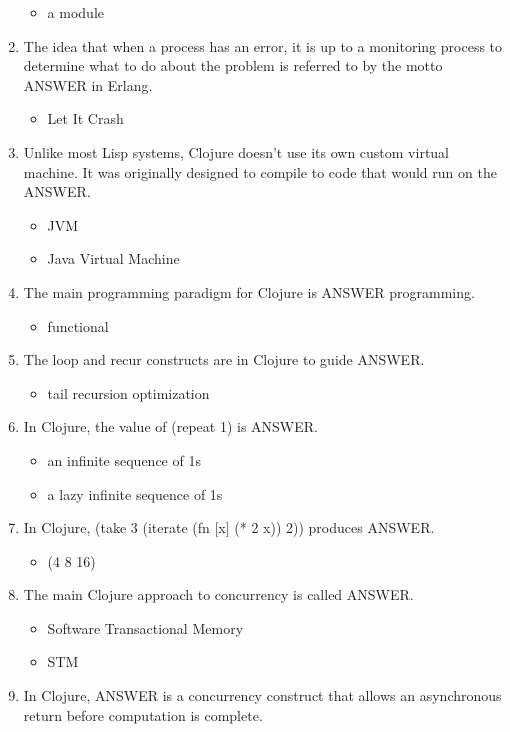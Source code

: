 \documentclass{exam}
\begin{document}
\begin{enumerate}
\begin{itemize}
\item a module
\end{itemize}
\item The idea that when a process has an error, it is up to a monitoring process to determine what to do about the problem is referred to by the motto ANSWER in Erlang.
\begin{itemize}
\item Let It Crash
\end{itemize}
\item Unlike most Lisp systems, Clojure doesn't use its own custom virtual machine.  It was originally designed to compile to code that would run on the ANSWER.
\begin{itemize}
\item JVM
\item Java Virtual Machine
\end{itemize}
\item The main programming paradigm for Clojure is ANSWER programming.
\begin{itemize}
\item functional
\end{itemize}
\item The loop and recur constructs are in Clojure to guide ANSWER.
\begin{itemize}
\item tail recursion optimization
\end{itemize}
\item In Clojure, the value of (repeat 1) is ANSWER.
\begin{itemize}
\item an infinite sequence of 1s
\item a lazy infinite sequence of 1s
\end{itemize}
\item In Clojure, (take 3 (iterate (fn $\lbrack$x$\rbrack$ (* 2 x)) 2)) produces ANSWER.
\begin{itemize}
\item (4 8 16)
\end{itemize}
\item The main Clojure approach to concurrency is called ANSWER.
\begin{itemize}
\item Software Transactional Memory
\item STM
\end{itemize}
\item In Clojure, ANSWER is a concurrency construct that allows an asynchronous return before computation is complete.

\end{enumerate}
\end{document}
